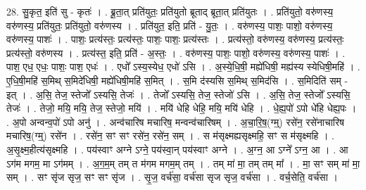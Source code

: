 \documentclass[17pt]{extarticle}
\begin{document}
28. सु॒कृत॒ इति॑ सु - कृतः॑ । . ब्रू॒ता॒त् प्रति॑युतः॒ प्रति॑युतो ब्रूताद् ब्रूता॒त् प्रति॑युतः । . प्रति॑युतो॒ वरु॑णस्य॒ वरु॑णस्य॒ प्रति॑युतः॒ प्रति॑युतो॒ वरु॑णस्य । . प्रति॑युत॒ इति॒ प्रति॑ - यु॒तः॒ । . वरु॑णस्य॒ पाशः॒ पाशो॒ वरु॑णस्य॒ वरु॑णस्य॒ पाशः॑ । . पाशः॒ प्रत्य॑स्तः॒ प्रत्य॑स्तः॒ पाशः॒ पाशः॒ प्रत्य॑स्तः । . प्रत्य॑स्तो॒ वरु॑णस्य॒ वरु॑णस्य॒ प्रत्य॑स्तः॒ प्रत्य॑स्तो॒ वरु॑णस्य । . प्रत्य॑स्त॒ इति॒ प्रति॑ - अ॒स्तः॒ । . वरु॑णस्य॒ पाशः॒ पाशो॒ वरु॑णस्य॒ वरु॑णस्य॒ पाशः॑ । . पाश॒ एध॒ एधः॒ पाशः॒ पाश॒ एधः॑ । . एधो᳚ ऽस्य॒स्येध॒ एधो॑ ऽसि । . अ॒स्ये॒धि॒षी॒ मह्ये॑धिषी॒ मह्य॑स्य स्येधिषी॒महि॑ । . ए॒धि॒षी॒महि॑ स॒मिथ् स॒मिदे॑धिषी॒ मह्ये॑धिषी॒महि॑ स॒मित् । . स॒मि द॑स्यसि स॒मिथ् स॒मिद॑सि । . स॒मिदिति॑ सम् - इत् । . अ॒सि॒ तेज॒ स्तेजो᳚ ऽस्यसि॒ तेजः॑ । . तेजो᳚ ऽस्यसि॒ तेज॒ स्तेजो॑ ऽसि । . अ॒सि॒ तेज॒ स्तेजो᳚ ऽस्यसि॒ तेजः॑ । . तेजो॒ मयि॒ मयि॒ तेज॒ स्तेजो॒ मयि॑ । . मयि॑ धेहि धेहि॒ मयि॒ मयि॑ धेहि । . धे॒ह्य॒पो॑ ऽपो धे॑हि धेह्य॒पः । . अ॒पो अन्वन्व॒पो॑ ऽपो अनु॑ । . अन्व॑चारिष मचारिष॒ मन्वन्व॑चारिषम् । . अ॒चा॒रि॒ष॒(ग्म्॒) रसे॑न॒ रसे॑नाचारिष मचारिष॒(ग्म्॒) रसे॑न । . रसे॑न॒ सꣳ सꣳ रसे॑न॒ रसे॑न॒ सम् । . स म॑सृक्ष्मह्यसृक्ष्महि॒ सꣳ स म॑सृक्ष्महि । . अ॒सृ॒क्ष्म॒हीत्य॑सृक्ष्महि । . पय॑स्वाꣳ अग्ने ऽग्ने॒ पय॑स्वा॒न् पय॑स्वाꣳ अग्ने । . अ॒ग्न॒ आ ऽग्ने᳚ ऽग्न॒ आ । . आ ऽग॑म मगम॒ मा ऽग॑मम् । . अ॒ग॒म॒म् तम् त म॑गम मगम॒म् तम् । . तम् मा॑ मा॒ तम् तम् मा᳚ । . मा॒ सꣳ सम् मा॑ मा॒ सम् । . सꣳ सृ॑ज सृज॒ सꣳ सꣳ सृ॑ज । . सृ॒ज॒ वर्च॑सा॒ वर्च॑सा सृज सृज॒ वर्च॑सा । . वर्च॒सेति॒ वर्च॑सा । \newline
\end{document}
